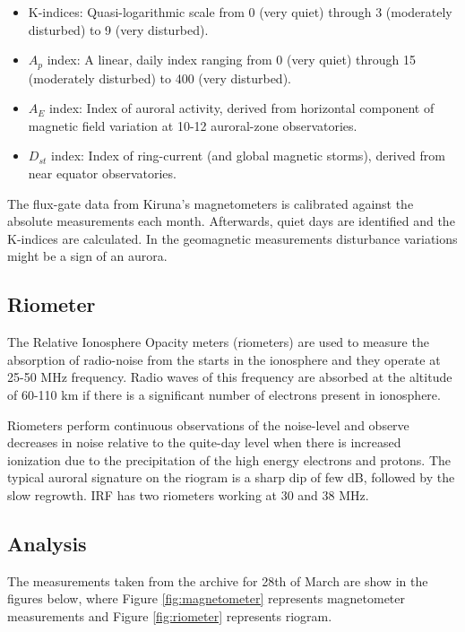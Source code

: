 \documentclass{article}
\begin{document}
\begin{itemize}
\item K-indices: Quasi-logarithmic scale from 0 (very quiet) through 3 (moderately disturbed) to 9 (very disturbed).
\item $A_p$ index: A linear, daily index ranging from 0 (very quiet) through 15 (moderately disturbed) to 400 (very disturbed).
\item $A_E$ index: Index of auroral activity, derived from horizontal component of magnetic field variation at 10-12 auroral-zone observatories.
\item $D_{st}$ index: Index of ring-current (and global magnetic storms), derived from near equator observatories.
\end{itemize}

The flux-gate data from Kiruna's magnetometers is calibrated against the absolute measurements each month. Afterwards, quiet days are identified and the K-indices are calculated. In the geomagnetic measurements disturbance variations might be a sign of an aurora.

\subsection{Riometer}
The Relative Ionosphere Opacity meters (riometers) are used to measure the absorption of radio-noise from the starts in the ionosphere and they operate at 25-50 MHz frequency. Radio waves of this frequency are absorbed at the altitude of 60-110 km if there is a significant number of electrons present in ionosphere.

Riometers perform continuous observations of the noise-level and observe decreases in noise relative to the quite-day level when there is increased ionization due to the precipitation of the high energy electrons and protons. The typical auroral signature on the riogram is a sharp dip of few dB, followed by the slow regrowth. IRF has two riometers working at 30 and 38 MHz.

\subsection{Analysis}
The measurements taken from the archive for 28th of March are show in the figures below, where Figure \ref{fig:magnetometer} represents magnetometer measurements and Figure \ref{fig:riometer} represents riogram.
\end{document}

